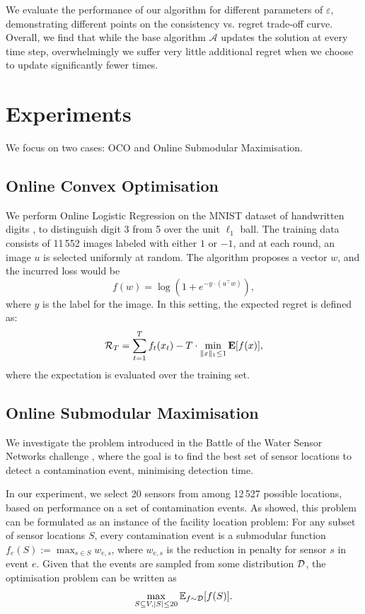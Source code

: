We evaluate the performance of our algorithm for different parameters of $\varepsilon$, demonstrating different points on the consistency vs. regret trade-off curve. Overall, we find that while the base algorithm $\mathcal{A}$ updates the solution at every time step, overwhelmingly we suffer very little additional regret when we choose to update significantly fewer times. 

\section{Experiments}
We focus on two cases: OCO and Online Submodular Maximisation.
\subsection*{Online Convex Optimisation} We perform Online Logistic Regression on the MNIST dataset of handwritten digits \citep{lecun1998mnist}, to distinguish digit 3 from 5 over the unit $\ell_1$ ball. The training data consists of 11\,552 images labeled with either $1$ or $-1$, and at each round, an image $u$ is selected uniformly at random. The algorithm proposes a vector $w$, and the incurred loss would be
\[
    f(w) = \log(1 + e^{-y\cdot(u^\top w)}),
\]
where $y$ is the label for the image. In this setting, the expected regret is defined as:
\[
    \mathcal{R}_T = \sum_{t=1}^T f_t(x_t) - T\cdot\min_{\|x\|_1 \leq 1} \mathbf{E}[f(x)],
\]
where the expectation is evaluated over the training set.

\subsection*{Online Submodular Maximisation}
We investigate the problem introduced in the Battle of the Water Sensor Networks challenge \citep{ostfeld08bwsn}, where the goal is to find the best set of sensor locations to detect a contamination event, minimising detection time.

In our experiment, we select 20 sensors from among 12\,527 possible locations, based on performance on a set of contamination events.  As \citet{leskovec07cost} showed, this problem can be formulated as an instance of the facility location problem: For any subset of sensor locations $S$, every contamination event is a submodular function $f_e(S) := \max_{s\in S} w_{e,s}$, where $w_{e,s}$ is the reduction in penalty for sensor $s$ in event $e$. Given that the events are sampled from some distribution $\mathcal{D}$, the optimisation problem can be written as
\[
    \max_{S\subseteq V, |S|\leq 20} \mathbb{E}_{f\sim \mathcal{D}}[f(S)].
\]

